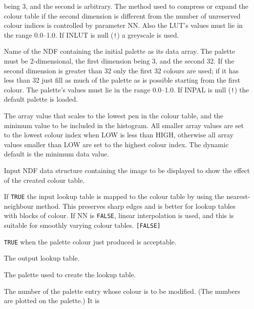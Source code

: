 \documentclass[twoside,11pt]{article}
\newcommand{\sstsubsection}[1]{ \item[{#1}] \mbox{} \\}
\renewcommand{\sstsubsection}[1]{\item[{#1}]}
\begin{document}
{{{         being 3, and the second is arbitrary.  The method used to
         compress or expand the colour table if the second dimension is
         different from the number of unreserved colour indices is
         controlled by parameter NN.  Also the LUT's values must lie in
         the range 0.0--1.0.  If INLUT is null ({\tt !}) a
         greyscale is used.
      }
      \sstsubsection{
         INPAL = NDF (Read)
      }{
         Name of the NDF containing the initial palette as its data
         array.  The palette must be 2-dimensional, the first dimension
         being 3, and the second 32.  If the second dimension is
         greater than 32 only the first 32 colours are used; if it has
         less than 32 just fill as much of the palette as is possible
         starting from the first colour.  The palette's values must lie
         in the range 0.0--1.0.  If INPAL is null ({\tt !}) the default
         palette is loaded.
      }
      \sstsubsection{
         LOW = \_DOUBLE (Read)
      }{
         The array value that scales to the lowest pen in the colour
         table, and the minimum value to be included in the histogram.
         All smaller array values are set to the lowest colour
         index when LOW is less than HIGH, otherwise all array values
         smaller than LOW are set to the highest colour index.   The
         dynamic default is the minimum data value.
      }
      \sstsubsection{
         NDF = NDF (Read)
      }{
         Input NDF data structure containing the image to be displayed
         to show the effect of the created colour table.
      }
      \sstsubsection{
         NN = \_LOGICAL (Read)
      }{
         If {\tt TRUE} the input lookup table is mapped to the colour table by
         using the nearest-neighbour method.  This preserves sharp
         edges and is better for lookup tables with blocks of colour.
         If NN is {\tt FALSE}, linear interpolation is used, and this is
         suitable for smoothly varying colour tables. {\tt [FALSE]}
      }
      \sstsubsection{
         OK = \_LOGICAL (Read)
      }{
         {\tt TRUE} when the palette colour just produced is acceptable.
      }
      \sstsubsection{
         OUTLUT = NDF (Write)
      }{
         The output lookup table.
      }
      \sstsubsection{
         OUTPAL = NDF (Write)
      }{
         The palette used to create the lookup table.
      }
      \sstsubsection{
         PALNUM = \_INTEGER (Read)
      }{
         The number of the palette entry whose colour is to be
         modified.  (The numbers are plotted on the palette.) It is
}}}
\end{document}

